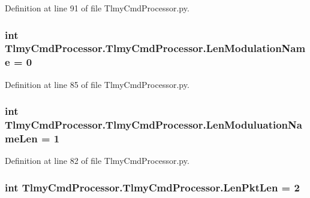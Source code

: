 Definition at line 91 of file Tlmy\+Cmd\+Processor.\+py.

\hypertarget{namespace_tlmy_cmd_processor_1_1_tlmy_cmd_processor_ada4bf8a260b4fea1839785e2928f71b2}{}
\subsubsection[{Len\+Modulation\+Name}]{\setlength{\rightskip}{0pt plus 5cm}int Tlmy\+Cmd\+Processor.\+Tlmy\+Cmd\+Processor.\+Len\+Modulation\+Name = 0}\label{namespace_tlmy_cmd_processor_1_1_tlmy_cmd_processor_ada4bf8a260b4fea1839785e2928f71b2}


Definition at line 85 of file Tlmy\+Cmd\+Processor.\+py.

\hypertarget{namespace_tlmy_cmd_processor_1_1_tlmy_cmd_processor_a251db0b074d036dc2764b58c8b186a94}{}
\subsubsection[{Len\+Moduluation\+Name\+Len}]{\setlength{\rightskip}{0pt plus 5cm}int Tlmy\+Cmd\+Processor.\+Tlmy\+Cmd\+Processor.\+Len\+Moduluation\+Name\+Len = 1}\label{namespace_tlmy_cmd_processor_1_1_tlmy_cmd_processor_a251db0b074d036dc2764b58c8b186a94}


Definition at line 82 of file Tlmy\+Cmd\+Processor.\+py.

\hypertarget{namespace_tlmy_cmd_processor_1_1_tlmy_cmd_processor_aaa7975541edbc48dcb803ca7acca8e20}{}
\subsubsection[{Len\+Pkt\+Len}]{\setlength{\rightskip}{0pt plus 5cm}int Tlmy\+Cmd\+Processor.\+Tlmy\+Cmd\+Processor.\+Len\+Pkt\+Len = 2}\label{namespace_tlmy_cmd_processor_1_1_tlmy_cmd_processor_aaa7975541edbc48dcb803ca7acca8e20}


